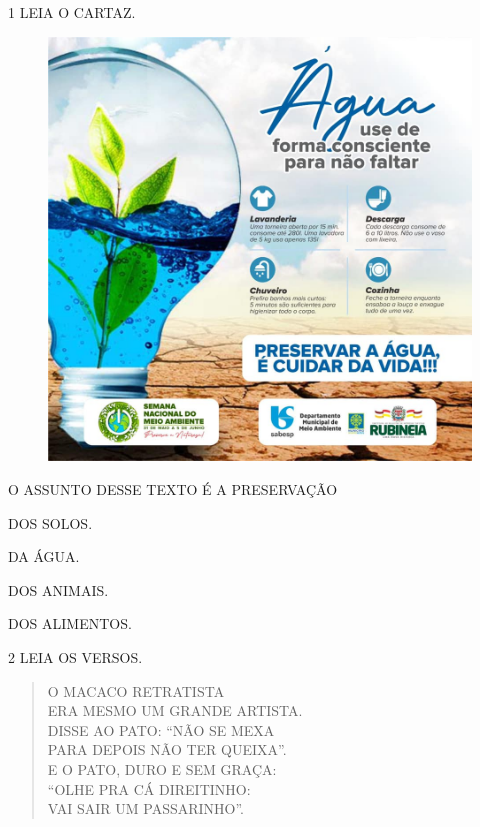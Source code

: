 
\num{1} LEIA O CARTAZ.

\begin{figure}[H]
\centering
\includegraphics[width=.8\textwidth]{media/image166.jpg}
\end{figure}

O ASSUNTO DESSE TEXTO É A PRESERVAÇÃO

\begin{multicols}{2}
\begin{escolha}
\item DOS SOLOS.

\item DA ÁGUA.

\item DOS ANIMAIS.

\item DOS ALIMENTOS.
\end{escolha}
\end{multicols}

\num{2} LEIA OS VERSOS.

\begin{myquote}
\begin{verse}
O MACACO RETRATISTA\\
ERA MESMO UM GRANDE ARTISTA.\\
DISSE AO PATO: ``NÃO SE MEXA\\
PARA DEPOIS NÃO TER QUEIXA''.\\
E O PATO, DURO E SEM GRAÇA:\\
``OLHE PRA CÁ DIREITINHO:\\
VAI SAIR UM PASSARINHO''.
\end{verse}

\end{myquote}

